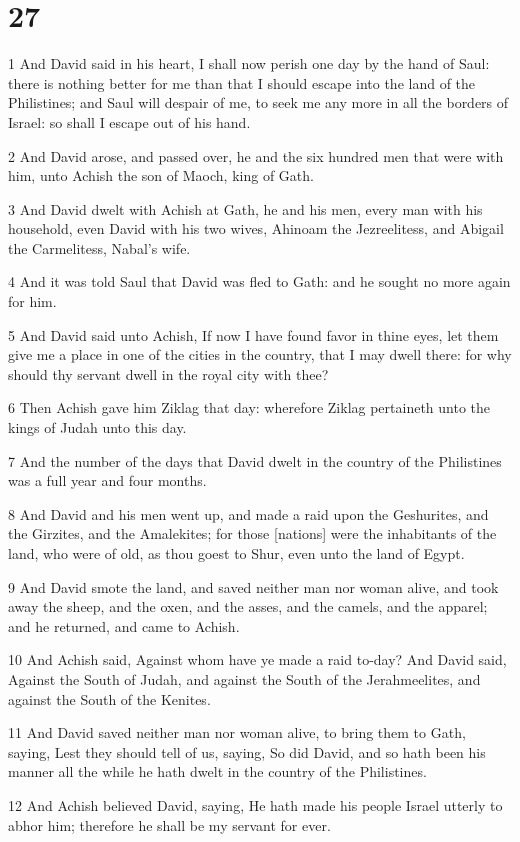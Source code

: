 \chapter{27}

\par 1 And David said in his heart, I shall now perish one day by the hand of Saul: there is nothing better for me than that I should escape into the land of the Philistines; and Saul will despair of me, to seek me any more in all the borders of Israel: so shall I escape out of his hand.
\par 2 And David arose, and passed over, he and the six hundred men that were with him, unto Achish the son of Maoch, king of Gath.
\par 3 And David dwelt with Achish at Gath, he and his men, every man with his household, even David with his two wives, Ahinoam the Jezreelitess, and Abigail the Carmelitess, Nabal's wife.
\par 4 And it was told Saul that David was fled to Gath: and he sought no more again for him.
\par 5 And David said unto Achish, If now I have found favor in thine eyes, let them give me a place in one of the cities in the country, that I may dwell there: for why should thy servant dwell in the royal city with thee?
\par 6 Then Achish gave him Ziklag that day: wherefore Ziklag pertaineth unto the kings of Judah unto this day.
\par 7 And the number of the days that David dwelt in the country of the Philistines was a full year and four months.
\par 8 And David and his men went up, and made a raid upon the Geshurites, and the Girzites, and the Amalekites; for those [nations] were the inhabitants of the land, who were of old, as thou goest to Shur, even unto the land of Egypt.
\par 9 And David smote the land, and saved neither man nor woman alive, and took away the sheep, and the oxen, and the asses, and the camels, and the apparel; and he returned, and came to Achish.
\par 10 And Achish said, Against whom have ye made a raid to-day? And David said, Against the South of Judah, and against the South of the Jerahmeelites, and against the South of the Kenites.
\par 11 And David saved neither man nor woman alive, to bring them to Gath, saying, Lest they should tell of us, saying, So did David, and so hath been his manner all the while he hath dwelt in the country of the Philistines.
\par 12 And Achish believed David, saying, He hath made his people Israel utterly to abhor him; therefore he shall be my servant for ever.

